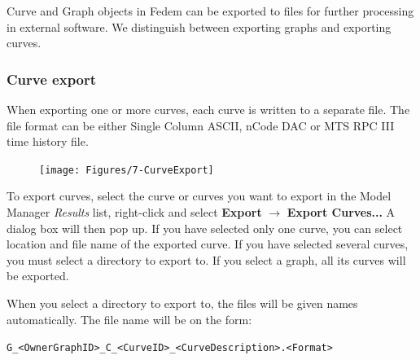 
Curve and Graph objects in Fedem can be exported to files
for further processing in external software.
We distinguish between exporting graphs and exporting curves.

\subsubsection{Curve export}

When exporting one or more curves, each curve is written to a separate file.
The file format can be either Single Column ASCII, nCode DAC or MTS RPC III
time history file.

\begin{figure}
  \vspace{-5mm}
  \texttt{[image: Figures/7-CurveExport]}
\end{figure}

To export curves, select the curve or curves you want to export in
the Model Manager {\sl Results} list, right-click and select
\textbf{Export} $\rightarrow$ \textbf{Export Curves...}
A dialog box will then pop up. If you have selected only one curve,
you can select location and file name of the exported curve.
If you have selected several curves, you must select a directory to export to.
If you select a graph, all its curves will be exported.

\medskip
When you select a directory to export to, the files will be given
names automatically. The file name will be on the form:

{\tt G\_\textless OwnerGraphID\textgreater\_C\_\textless CurveID\textgreater\_\textless CurveDescription\textgreater.\textless Format\textgreater}




